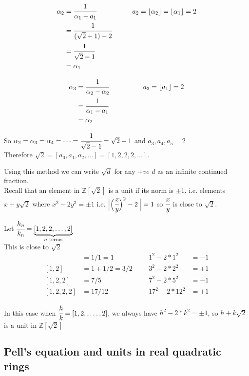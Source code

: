 \documentclass[11pt]{article}
\begin{document}
\begin{align*}
	\alpha_2 &= \cfrac{1}{\alpha_1- a_1} &&&&& a_2 = \lfloor \alpha_2 \rfloor = \lfloor \alpha_1 \rfloor  = 2\\
&= \cfrac{1}{(\sqrt{2} +1 )-2 }\\
	&= \cfrac{1}{\sqrt{2}-1}\\
	&=\alpha_1
\end{align*}

\begin{align*}
	\alpha_3 &= \cfrac{1}{\alpha_2-\alpha_2} &&&&&&&&& a_3= \lfloor a_1 \rfloor = 2\\
	&= \cfrac{1}{\alpha_1-a_1}\\
	&=\alpha_2
\end{align*}

So $\alpha_2=\alpha_3=\alpha_4=\dots = \cfrac{1}{\sqrt2 - 1} = \sqrt{2} +1$ and $a_3, a_4, a_5 = 2$
\\[1em]

Therefore $\sqrt{2} = [a_0,a_1,a_2, \dots ] = [1,2,2,2,\dots]$.

$ $ \\

Using this method we can write $\sqrt{d}$ for any $+ve$ $d$ as an infinite continued fraction.
$ $\\[1em]
Recall that an element in $\mathbb{Z}[\sqrt2]$ is a unit if its norm is $\pm 1$, i.e. elements $x+y\sqrt{2} $ where $x^2 - 2y^2 = \pm 1$ i.e. $\Big| \Big( \cfrac{x}{y} \Big)^2 -2 \hspace{2pt}\Big | = 1$ so $\cfrac{x}{y}$ is close to $\sqrt{2}$.

$ $\\[1em]
Let $\cfrac{h_n}{k_n} = \underbrace{[1,2,2,\dots, 2]}_{n \text{ terms}}$\\[1em]
This is close to $\sqrt{2}$
\begin{align*}
	[1] &= 1/1 = 1 &&& 1^2-2*1^2 &= -1  \\
	[1,2] &= 1 + 1/2 = 3/2 &&& 3^2 - 2*2^2 &=+ 1\\
	[1,2,2] &= 7/5 &&& 7^2 - 2*5^2 &= -1\\
	[1,2,2,2] &=17/12 &&& 17^2-2*12^2 &=+ 1
\end{align*}


$ $\\
In this case when $\cfrac{h}{k} = [1,2,,\dots,2]$, we always have $h^2 - 2*k^2 = \pm 1$, so $h+k\sqrt{2} $ is a unit in $\mathbb{Z}[\sqrt{2}]$

\subsection{Pell's equation and units in real quadratic rings}
\end{document}
